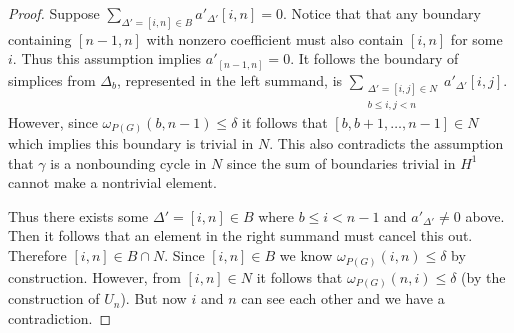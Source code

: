 \documentclass[pdflatex,bst/sn-mathphys-num]{sn-jnl}%
\theoremstyle{thmstyleone}%
\theoremstyle{definition}
\theoremstyle{thmstyletwo}%
\theoremstyle{thmstylethree}%
\begin{document}
\begin{proof}
    Suppose $\sum_{\Delta'=[i,n]\in B}a'_{\Delta'} [i,n]=0$.
    Notice that that any boundary containing $[n-1,n]$ with nonzero coefficient must also contain $[i,n]$ for some $i$. Thus this assumption implies $a'_{[n-1,n]}=0$. It follows the boundary of simplices from $\Delta_b$, represented in the left summand, is $\sum_{\substack{\Delta'=[i,j]\in N\\b\leq  i,j< n}}a'_{\Delta'} [i,j]$. 
    However, since $\omega_{P(G)}(b,n-1)\leq \delta$ it follows that $[b,b+1,\dotsc,n-1]\in N$ which implies this boundary is trivial in $N$. This also contradicts the assumption that $\gamma$ is a nonbounding cycle in $N$ since the sum of boundaries trivial in $H^1$ cannot make a nontrivial element.

    
    Thus there exists some $\Delta'=[i,n]\in B$ where $b\leq i<n-1$ and $a'_{\Delta'}\neq 0$ above. Then it follows that an element in the right summand must cancel this out. Therefore $[i,n]\in B\cap N$. Since $[i,n]\in B$ we know $\omega_{P(G)}(i,n)\leq \delta$ by construction. However, from $[i,n]\in N$ it follows that $\omega_{P(G)}(n,i)\leq \delta$ (by the construction of $U_n$). But now $i$ and $n$ can see each other and we have a contradiction.
\end{proof}



    
    

\end{document}
